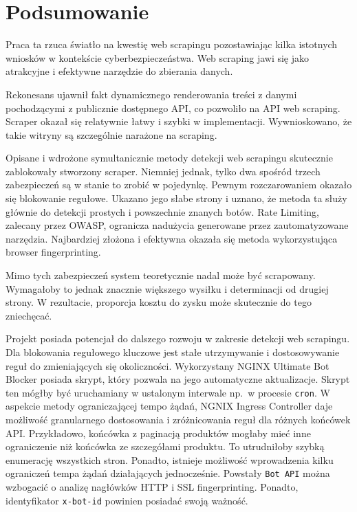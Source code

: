 \newpage


\section{Podsumowanie}\label{sec:podsumowanie}

Praca ta rzuca światło na kwestię web scrapingu pozostawiając kilka istotnych wniosków w kontekście cyberbezpieczeństwa.
Web scraping jawi się jako atrakcyjne i efektywne narzędzie do zbierania danych.

Rekonesans ujawnił fakt dynamicznego renderowania treści z danymi pochodzącymi z publicznie dostępnego API\@, co pozwoliło na API web scraping.
Scraper okazał się relatywnie łatwy i szybki w implementacji.
Wywnioskowano, że takie witryny są szczególnie narażone na scraping.

Opisane i wdrożone symultanicznie metody detekcji web scrapingu skutecznie zablokowały stworzony scraper.
Niemniej jednak, tylko dwa spośród trzech zabezpieczeń są w stanie to zrobić w pojedynkę.
Pewnym rozczarowaniem okazało się blokowanie regułowe.
Ukazano jego słabe strony i uznano, że metoda ta służy głównie do detekcji prostych i powszechnie znanych botów.
Rate Limiting, zalecany przez OWASP, ogranicza nadużycia generowane przez zautomatyzowane narzędzia.
Najbardziej złożona i efektywna okazała się metoda wykorzystująca browser fingerprinting.

Mimo tych zabezpieczeń system teoretycznie nadal może być scrapowany.
Wymagałoby to jednak znacznie większego wysiłku i determinacji od drugiej strony.
W rezultacie, proporcja kosztu do zysku może skutecznie do tego zniechęcać.

Projekt posiada potencjał do dalszego rozwoju w zakresie detekcji web scrapingu.
Dla blokowania regułowego kluczowe jest stałe utrzymywanie i dostosowywanie reguł do zmieniających się okoliczności.
Wykorzystany NGINX Ultimate Bot Blocker posiada skrypt, który pozwala na jego automatyczne aktualizacje.
Skrypt ten mógłby być uruchamiany w ustalonym interwale np.~w procesie \texttt{cron}.
W aspekcie metody ograniczającej tempo żądań, NGNIX Ingress Controller daje możliwość granularnego dostosowania i zróżnicowania reguł dla różnych końcówek API\@.
Przykładowo, końcówka z paginacją produktów mogłaby mieć inne ograniczenie niż końcówka ze szczegółami produktu.
To utrudniłoby szybką enumerację wszystkich stron.
Ponadto, istnieje możliwość wprowadzenia kilku ograniczeń tempa żądań działających jednocześnie.
Powstały \texttt{Bot API} można wzbogacić o analizę nagłówków HTTP i SSL fingerprinting.
Ponadto, identyfikator \texttt{x-bot-id} powinien posiadać swoją ważność.
